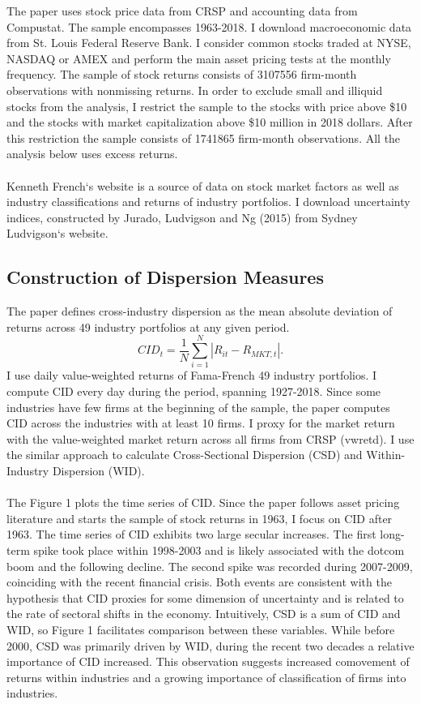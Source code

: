\documentclass[12pt]{article}
\begin{document}
The paper uses stock price data from CRSP and accounting data from Compustat. The sample encompasses 1963-2018. I download macroeconomic data from St. Louis Federal Reserve Bank. 
I consider common stocks traded at NYSE, NASDAQ or AMEX and perform the main asset pricing tests at the monthly frequency. The sample of stock returns consists of 3107556 firm-month observations with nonmissing returns. In order to exclude small and illiquid stocks from the analysis, I restrict the sample to the stocks with price above \$10 and the stocks with market capitalization above \$10 million in 2018 dollars. After this restriction the sample consists of 1741865 firm-month observations. All the analysis below uses excess returns.
\paragraph{}
Kenneth French`s website is a source of data on stock market factors as well as industry classifications and returns of industry portfolios. I download uncertainty indices, constructed by Jurado, Ludvigson and Ng (2015) from Sydney Ludvigson`s website. 

\subsection{Construction of Dispersion Measures}

The paper defines cross-industry dispersion as the mean absolute deviation of returns across 49 industry portfolios at any given period.
\begin{equation}
CID_t = \frac{1}{N}\sum^{N}_{i=1}{|R_{it}-R_{MKT,t}|}.
\end{equation}
I use daily value-weighted returns of Fama-French 49 industry portfolios. I compute CID every day during the period, spanning 1927-2018. Since some industries have few firms at the beginning of the sample, the paper computes CID across the industries with at least 10 firms. I proxy for the market return with the value-weighted market return across all firms from CRSP (vwretd). I use the similar approach to calculate Cross-Sectional Dispersion (CSD) and Within-Industry Dispersion (WID).
\paragraph{}
The Figure 1 plots the time series of CID. Since the paper follows asset pricing literature and starts the sample of stock returns in 1963, I focus on CID after 1963. The time series of CID exhibits two large secular increases. The first long-term spike took place within 1998-2003 and is likely associated with the dotcom boom and the following decline. The second spike was recorded during 2007-2009, coinciding with the recent financial crisis. Both events are consistent with the hypothesis that CID proxies for some dimension of uncertainty and is related to the rate of sectoral shifts in the economy. Intuitively, CSD is a sum of CID and WID, so Figure 1 facilitates comparison between these variables. While before 2000, CSD was primarily driven by WID, during the recent two decades a relative importance of CID increased. This observation suggests increased comovement of returns within industries and a growing importance of classification of firms into industries.
\end{document}
